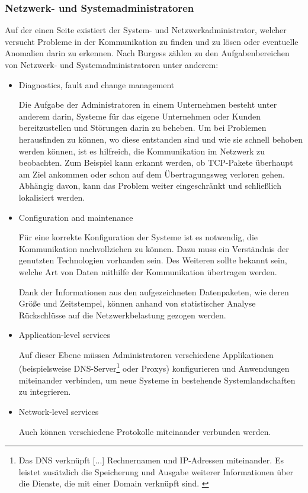     \subsubsection{Netzwerk- und Systemadministratoren} \label{NetzwerkUndSystemadmin}
    Auf der einen Seite existiert der System- und Netzwerkadministrator, welcher versucht Probleme in der Kommunikation zu finden und zu lösen oder eventuelle Anomalien darin zu erkennen.
    Nach Burgess \cite{burgess2004principles} zählen zu den Aufgabenbereichen von Netzwerk- und Systemadministratoren unter anderem:
    \begin{itemize}
        \item \glqq Diagnostics, fault and change management\grqq{}
        
        Die Aufgabe der Administratoren in einem Unternehmen besteht unter anderem darin, Systeme für das eigene Unternehmen oder Kunden bereitzustellen und Störungen darin zu beheben. Um bei Problemen herausfinden zu können, wo diese entstanden sind und wie sie schnell behoben werden können, ist es hilfreich, die Kommunikation im Netzwerk zu beobachten. Zum Beispiel kann erkannt werden, ob \ac{TCP}-Pakete überhaupt am Ziel ankommen oder schon auf dem Übertragungsweg verloren gehen. Abhängig davon, kann das Problem weiter eingeschränkt und schließlich lokalisiert werden.
        
        \item \glqq Configuration and maintenance\grqq{}
        
        Für eine korrekte Konfiguration der Systeme ist es notwendig, die Kommunikation nachvollziehen zu können. Dazu muss ein Verständnis der genutzten Technologien vorhanden sein. Des Weiteren sollte bekannt sein, welche Art von Daten mithilfe der Kommunikation übertragen werden.
        
        Dank der Informationen aus den aufgezeichneten Datenpaketen, wie deren Größe und Zeitstempel, können anhand von statistischer Analyse Rückschlüsse auf die Netzwerkbelastung gezogen werden.
        
        \item \glqq Application-level services\grqq{}
        
        Auf dieser Ebene müssen Administratoren verschiedene Applikationen (beispielsweise \ac{DNS}-Server\footnote{\glqq Das DNS verknüpft [...] Rechnernamen und IP-Adressen miteinander. Es leistet zusätzlich die Speicherung und Ausgabe weiterer Informationen über die Dienste, die mit einer Domain verknüpft sind.\grqq{} \cite{denic_eg}} oder Proxys) konfigurieren und Anwendungen miteinander verbinden, um neue Systeme in bestehende Systemlandschaften zu integrieren.
        
        \item \glqq Network-level services\grqq{}
        
        Auch können verschiedene Protokolle miteinander verbunden werden.
        
    \end{itemize}

